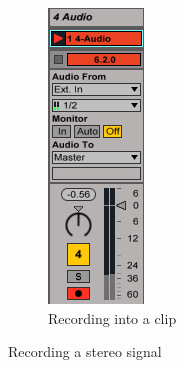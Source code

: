 \documentclass{article}
\begin{document}
\begin{enumerate}
\begin{figure}[h!]
\begin{subfigure}[b]{0.3\textwidth}
				    \includegraphics[width=\textwidth]{images/recording_stereo}
					  \caption{Recording into a clip}
					  \label{recording_stereo}
					\end{subfigure}
					\caption{Recording a stereo signal}
					\label{recording a stereo signal}
				\end{figure}


\end{enumerate}
\end{document}
